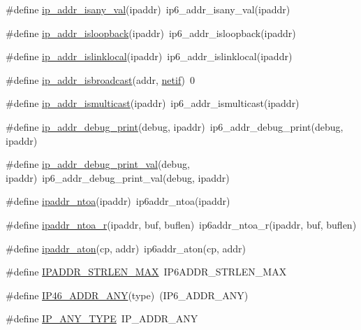 \begin{DoxyCompactItemize}
\item 
\#define \hyperlink{openmote-cc2538_2lwip_2src_2include_2lwip_2ip__addr_8h_acd8f5aa151cff966fd28368b85f38c05}{ip\+\_\+addr\+\_\+isany\+\_\+val}(ipaddr)~ip6\+\_\+addr\+\_\+isany\+\_\+val(ipaddr)
\item 
\#define \hyperlink{openmote-cc2538_2lwip_2src_2include_2lwip_2ip__addr_8h_a0fc8bf6662809274750868683b3a422e}{ip\+\_\+addr\+\_\+isloopback}(ipaddr)~ip6\+\_\+addr\+\_\+isloopback(ipaddr)
\item 
\#define \hyperlink{openmote-cc2538_2lwip_2src_2include_2lwip_2ip__addr_8h_a33bc079baaf513a9a7381b9531a1f653}{ip\+\_\+addr\+\_\+islinklocal}(ipaddr)~ip6\+\_\+addr\+\_\+islinklocal(ipaddr)
\item 
\#define \hyperlink{openmote-cc2538_2lwip_2src_2include_2lwip_2ip__addr_8h_a11275b39f9b8e876e8124a16410e8840}{ip\+\_\+addr\+\_\+isbroadcast}(addr,  \hyperlink{structnetif}{netif})~0
\item 
\#define \hyperlink{openmote-cc2538_2lwip_2src_2include_2lwip_2ip__addr_8h_a2170d3ee13dd22722222228e7b1c5752}{ip\+\_\+addr\+\_\+ismulticast}(ipaddr)~ip6\+\_\+addr\+\_\+ismulticast(ipaddr)
\item 
\#define \hyperlink{openmote-cc2538_2lwip_2src_2include_2lwip_2ip__addr_8h_af7d84bce2fb861a97f3047ecd69ab018}{ip\+\_\+addr\+\_\+debug\+\_\+print}(debug,  ipaddr)~ip6\+\_\+addr\+\_\+debug\+\_\+print(debug, ipaddr)
\item 
\#define \hyperlink{openmote-cc2538_2lwip_2src_2include_2lwip_2ip__addr_8h_ac3d7eec8027db2203117e6f30df8fba5}{ip\+\_\+addr\+\_\+debug\+\_\+print\+\_\+val}(debug,  ipaddr)~ip6\+\_\+addr\+\_\+debug\+\_\+print\+\_\+val(debug, ipaddr)
\item 
\#define \hyperlink{openmote-cc2538_2lwip_2src_2include_2lwip_2ip__addr_8h_ad345f630acbf2a01536d10d3aacee04f}{ipaddr\+\_\+ntoa}(ipaddr)~ip6addr\+\_\+ntoa(ipaddr)
\item 
\#define \hyperlink{openmote-cc2538_2lwip_2src_2include_2lwip_2ip__addr_8h_ac5a2215f804102c72f59dcdf1ccf6449}{ipaddr\+\_\+ntoa\+\_\+r}(ipaddr,  buf,  buflen)~ip6addr\+\_\+ntoa\+\_\+r(ipaddr, buf, buflen)
\item 
\#define \hyperlink{openmote-cc2538_2lwip_2src_2include_2lwip_2ip__addr_8h_a9b9fae6ad88a288c3c6da050644e2a48}{ipaddr\+\_\+aton}(cp,  addr)~ip6addr\+\_\+aton(cp, addr)
\item 
\#define \hyperlink{openmote-cc2538_2lwip_2src_2include_2lwip_2ip__addr_8h_a8619278bcbf705844f584f36972fc758}{I\+P\+A\+D\+D\+R\+\_\+\+S\+T\+R\+L\+E\+N\+\_\+\+M\+AX}~I\+P6\+A\+D\+D\+R\+\_\+\+S\+T\+R\+L\+E\+N\+\_\+\+M\+AX
\item 
\#define \hyperlink{openmote-cc2538_2lwip_2src_2include_2lwip_2ip__addr_8h_ae221446ab455b8a1a0d2a4153b9c1bb3}{I\+P46\+\_\+\+A\+D\+D\+R\+\_\+\+A\+NY}(type)~(I\+P6\+\_\+\+A\+D\+D\+R\+\_\+\+A\+NY)
\item 
\#define \hyperlink{openmote-cc2538_2lwip_2src_2include_2lwip_2ip__addr_8h_abe43b154533b73585c4e58f568370ede}{I\+P\+\_\+\+A\+N\+Y\+\_\+\+T\+Y\+PE}~I\+P\+\_\+\+A\+D\+D\+R\+\_\+\+A\+NY
\end{DoxyCompactItemize}
